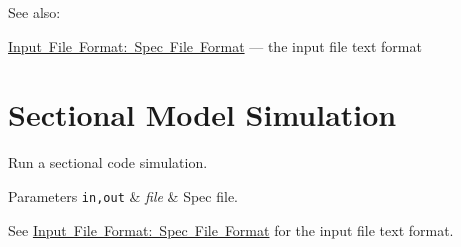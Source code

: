 See also\+:
\begin{DoxyItemize}
\item \mbox{\hyperlink{spec_file_format}{Input File Format\+: Spec File Format}} --- the input file text format 
\end{DoxyItemize}\hypertarget{input_format_sectional}{}\section{Sectional Model Simulation}\label{input_format_sectional}
Run a sectional code simulation.


\begin{DoxyParams}[1]{Parameters}
\mbox{\tt in,out}  & {\em file} & Spec file.\\
\hline
\end{DoxyParams}
See \mbox{\hyperlink{spec_file_format}{Input File Format\+: Spec File Format}} for the input file text format.


